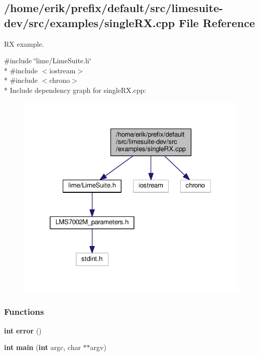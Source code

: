 \subsection{/home/erik/prefix/default/src/limesuite-\/dev/src/examples/single\+RX.cpp File Reference}
\label{singleRX_8cpp}


RX example.  


{\ttfamily \#include \char`\"{}lime/\+Lime\+Suite.\+h\char`\"{}}\\*
{\ttfamily \#include $<$iostream$>$}\\*
{\ttfamily \#include $<$chrono$>$}\\*
Include dependency graph for single\+R\+X.\+cpp\+:
\nopagebreak
\begin{figure}[H]
\begin{center}
\leavevmode
\includegraphics[width=325pt]{d3/d0f/singleRX_8cpp__incl}
\end{center}
\end{figure}
\subsubsection*{Functions}
\begin{DoxyCompactItemize}
\item 
{\bf int} {\bf error} ()
\item 
{\bf int} {\bf main} ({\bf int} argc, char $\ast$$\ast$argv)
\end{DoxyCompactItemize}
